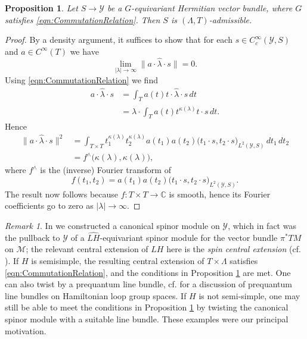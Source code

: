 \documentclass[11pt,reqno]{amsart}
\newtheorem{proposition}[theorem]{Proposition}
\theoremstyle{definition}
\theoremstyle{remark}
\newtheorem{remark}[theorem]{Remark}
\newcommand{\wh}[1]{\widehat{#1}}
\def\Y{\ensuremath{\mathcal{Y}}}
\def\M{\ensuremath{\mathcal{M}}}
\def\bC{\ensuremath{\mathbb{C}}}
\begin{document}
\begin{proposition}
\label{prop:LambdaTAdmissible}
Let $S \rightarrow \Y$ be a $G$-equivariant Hermitian vector bundle, where $G$ satisfies \eqref{eqn:CommutationRelation}.  Then $S$ is $(\Lambda,T)$-admissible.
\end{proposition}
\begin{proof}
By a density argument, it suffices to show that for each $s \in C^\infty_c(\Y,S)$ and $a \in C^\infty(T)$ we have
\[ \lim_{|\lambda|\rightarrow \infty} \|a\cdot \wh{\lambda} \cdot s\|=0.\]
Using \eqref{eqn:CommutationRelation} we find
\begin{align*} 
a \cdot \wh{\lambda} \cdot s&=\int_T a(t) t\cdot \wh{\lambda} \cdot s \, dt\\
&=\wh{\lambda} \cdot \int_T a(t)t^{\kappa(\lambda)} t\cdot s \, dt.
\end{align*}
Hence
\begin{align*} 
\|a\cdot \wh{\lambda} \cdot s\|^2&=\int_{T \times T} t_1^{\kappa(\lambda)}t_2^{\kappa(\lambda)} a(t_1)a(t_2)\big(t_1\cdot s,t_2\cdot s\big)_{L^2(\Y,S)}\, dt_1\,dt_2\\
&=f^\wedge\big(\kappa(\lambda),\kappa(\lambda)\big),
\end{align*}
where $f^\wedge$ is the (inverse) Fourier transform of
\[ f(t_1,t_2)=a(t_1)a(t_2)\big(t_1\cdot s,t_2\cdot s\big)_{L^2(\Y,S)}.\]
The result now follows because $f\colon T\times T \rightarrow \bC$ is smooth, hence its Fourier coefficients go to zero as $|\lambda| \rightarrow \infty$.
\end{proof}
\begin{remark}
\label{rem:Canonical}
In \cite{LMSspinor} we constructed a canonical spinor module on $\Y$, which in fact was the pullback to $\Y$ of a $\wh{LH}$-equivariant spinor module for the vector bundle $\pi^\ast TM$ on $\M$; the relevant central extension of $LH$ here is the \emph{spin central extension} (cf. \cite{PressleySegal,FHTII}).  If $H$ is semisimple, the resulting central extension of $T \times \Lambda$ satisfies \eqref{eqn:CommutationRelation}, and the conditions in Proposition \ref{prop:LambdaTAdmissible} are met.  One can also twist by a prequantum line bundle, cf. \cite{AMWVerlinde} for a discussion of prequantum line bundles on Hamiltonian loop group spaces.  If $H$ is not semi-simple, one may still be able to meet the conditions in Proposition \ref{prop:LambdaTAdmissible} by twisting the canonical spinor module with a suitable line bundle.  These examples were our principal motivation.
\end{remark}
\end{document}
